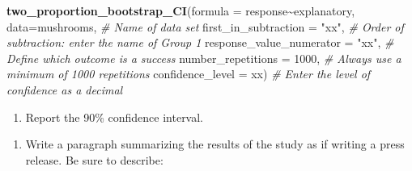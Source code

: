 \documentclass[
]{report}
\newenvironment{Shaded}{\begin{snugshade}}{\end{snugshade}}
\newcommand{\AttributeTok}[1]{\textcolor[rgb]{0.13,0.29,0.53}{#1}}
\newcommand{\CommentTok}[1]{\textcolor[rgb]{0.56,0.35,0.01}{\textit{#1}}}
\newcommand{\DecValTok}[1]{\textcolor[rgb]{0.00,0.00,0.81}{#1}}
\newcommand{\FunctionTok}[1]{\textcolor[rgb]{0.13,0.29,0.53}{\textbf{#1}}}
\newcommand{\NormalTok}[1]{#1}
\newcommand{\SpecialCharTok}[1]{\textcolor[rgb]{0.81,0.36,0.00}{\textbf{#1}}}
\newcommand{\StringTok}[1]{\textcolor[rgb]{0.31,0.60,0.02}{#1}}
\providecommand{\tightlist}{%
  \setlength{\itemsep}{0pt}\setlength{\parskip}{0pt}}
\begin{document}
\begin{Shaded}
\begin{Highlighting}[]
\FunctionTok{two\_proportion\_bootstrap\_CI}\NormalTok{(}\AttributeTok{formula =}\NormalTok{ response}\SpecialCharTok{\textasciitilde{}}\NormalTok{explanatory, }
         \AttributeTok{data=}\NormalTok{mushrooms, }\CommentTok{\# Name of data set}
         \AttributeTok{first\_in\_subtraction =} \StringTok{"xx"}\NormalTok{, }\CommentTok{\# Order of subtraction: enter the name of Group 1}
         \AttributeTok{response\_value\_numerator =} \StringTok{"xx"}\NormalTok{, }\CommentTok{\# Define which outcome is a success }
         \AttributeTok{number\_repetitions =} \DecValTok{1000}\NormalTok{, }\CommentTok{\# Always use a minimum of 1000 repetitions}
         \AttributeTok{confidence\_level =}\NormalTok{ xx) }\CommentTok{\# Enter the level of confidence as a decimal}
\end{Highlighting}
\end{Shaded}

\begin{enumerate}
\def\labelenumi{\arabic{enumi}.}
\setcounter{enumi}{9}
\tightlist
\item
  Report the 90\% confidence interval.
\end{enumerate}

\vspace{0.2in}

\begin{enumerate}
\def\labelenumi{\arabic{enumi}.}
\setcounter{enumi}{10}
\tightlist
\item
  Write a paragraph summarizing the results of the study as if writing a press release. Be sure to describe:
\end{enumerate}
\end{document}
